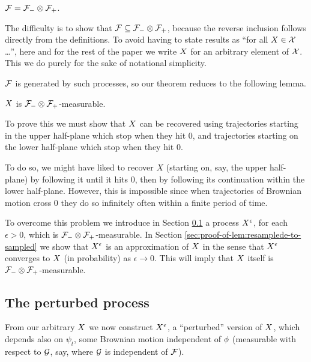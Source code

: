 {\begin{theorem}\label{thm:recoveringfromhalfplanes}
  $\mathcal{F} = \mathcal{F}_{-} \otimes \mathcal{F}_{+}$.
\end{theorem}

The difficulty is to show that $\mathcal{F} \subseteq \mathcal{F}_{-} \otimes \mathcal{F}_{+}$,
because the reverse inclusion follows directly from the definitions.
To avoid having to state results as ``for all $X \in \mathcal{X}$
\ldots'', here and for the rest of the paper we write $X$ for
an arbitrary element of $\mathcal{X}$.  This we do purely for the sake of
notational simplicity.

$\mathcal{F}$ is generated by such processes, so
our theorem reduces to the following lemma.

\begin{lemma}
  \label{lem:sampled-twostrip-meas}
  $X$ is $\mathcal{F}_{-} \otimes \mathcal{F}_{+}$-measurable.
\end{lemma}

To prove this we must show that $X$ can be recovered using
trajectories starting in the upper half-plane which stop when they hit
$0$, and trajectories starting on the lower half-plane which stop when
they hit $0$.

To do so, we might have liked to recover $X$ (starting on, say, the
upper half-plane) by following it until it hits 0, then by following its
continuation within the lower half-plane.  However, this is impossible
since when trajectories of Brownian motion cross $0$ they do so
infinitely often within a finite period of time.

To overcome this problem we introduce in Section
\ref{subsec:the-perturbed-process} a process $X^{\epsilon}$, for each
$\epsilon > 0$, which is $\mathcal{F}_{-} \otimes \mathcal{F}_{+}$-measurable.  In Section
\ref{sec:proof-of-lem:resamplede-to-sampled} we show that
$X^{\epsilon}$ is an approximation of $X$ in the sense that
$X^{\epsilon}$ converges to $X$ (in probability) as $\epsilon \to 0$.  This will
imply that $X$ itself is $\mathcal{F}_{-} \otimes \mathcal{F}_{+}$-measurable.

\subsection{The perturbed process}
\label{subsec:the-perturbed-process}


{
\newcommand{\joinernoargs}{\psi}
\newcommand{\joiner}[2]{\joinernoargs_{{#1}{#2}}}
\newcommand{\joinerval}[1]{\joinernoargs_{#1}}
  From our arbitrary $X$ we now construct $X^{\epsilon}$, a
  ``perturbed'' version of $X$, which depends also on
  $\joinerval{t}$,
  some Brownian motion independent of $\phi$ (measurable with
  respect to $\mathcal{G}$, say, where $\mathcal{G}$ is independent of
  $\mathcal{F}$).

}}
